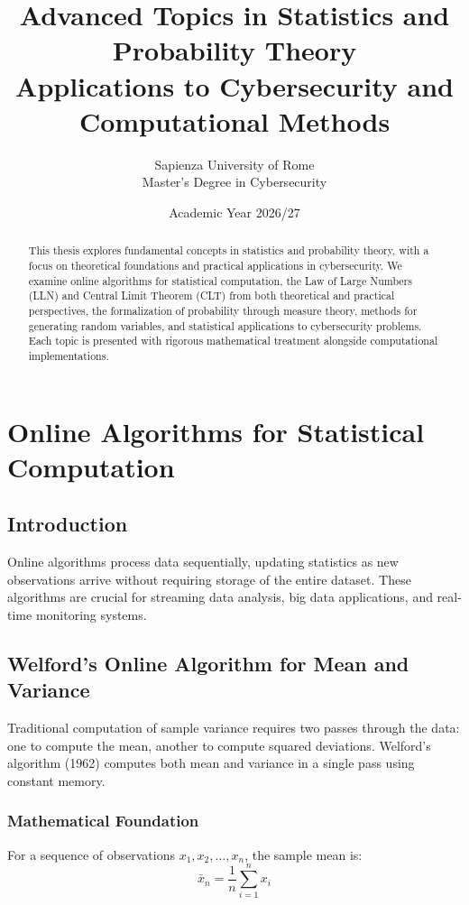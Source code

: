 \documentclass[12pt,a4paper]{article}
\title{\textbf{Advanced Topics in Statistics and Probability Theory}\\
\large{Applications to Cybersecurity and Computational Methods}}
\author{Sapienza University of Rome\\Master's Degree in Cybersecurity}
\date{Academic Year 2026/27}
\begin{document}
\maketitle

\begin{abstract}
This thesis explores fundamental concepts in statistics and probability theory, with a focus on theoretical foundations and practical applications in cybersecurity. We examine online algorithms for statistical computation, the Law of Large Numbers (LLN) and Central Limit Theorem (CLT) from both theoretical and practical perspectives, the formalization of probability through measure theory, methods for generating random variables, and statistical applications to cybersecurity problems. Each topic is presented with rigorous mathematical treatment alongside computational implementations.
\end{abstract}

\tableofcontents
\newpage

\section{Online Algorithms for Statistical Computation}

\subsection{Introduction}
Online algorithms process data sequentially, updating statistics as new observations arrive without requiring storage of the entire dataset. These algorithms are crucial for streaming data analysis, big data applications, and real-time monitoring systems.

\subsection{Welford's Online Algorithm for Mean and Variance}

Traditional computation of sample variance requires two passes through the data: one to compute the mean, another to compute squared deviations. Welford's algorithm (1962) computes both mean and variance in a single pass using constant memory.

\subsubsection{Mathematical Foundation}
For a sequence of observations $x_1, x_2, \ldots, x_n$, the sample mean is:
\begin{equation}
\bar{x}_n = \frac{1}{n}\sum_{i=1}^n x_i
\end{equation}
\end{document}
